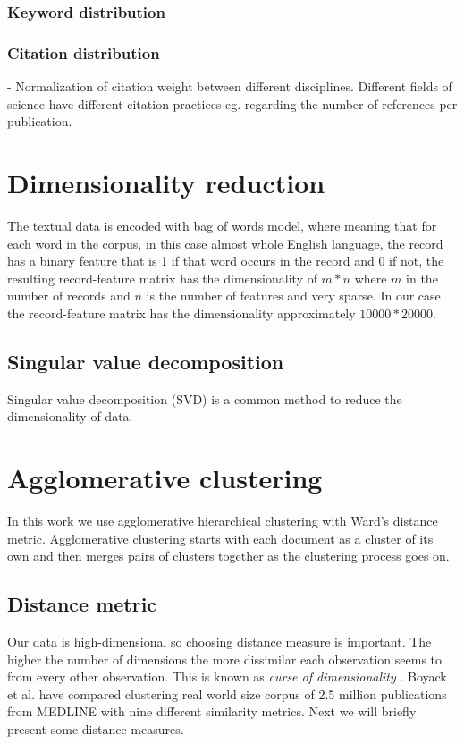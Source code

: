 \subsubsection{Keyword distribution}
\subsubsection{Citation distribution}
- Normalization of citation weight between different disciplines.
  Different fields of science have different citation practices 
eg. regarding the number of references per publication. 
\cite{waltman_new_2012}


\section{Dimensionality reduction}
\label{sec:dimensionalityreduction}
The textual data is encoded with bag of words model, where 
meaning that for each word in the corpus, in this case almost 
whole English language, the record has a binary feature that is 1 
if that word occurs in the record and 0 if not, the resulting 
record-feature matrix has the dimensionality of $m*n$ where $m$ in 
the number of records and $n$ is the number of features and very 
sparse. In our case the record-feature matrix has the 
dimensionality approximately $10000*20000$. 


\subsection{Singular value decomposition}
Singular value decomposition (SVD) is a common method to reduce 
the dimensionality of data. 


\section{Agglomerative clustering}
\label{sec:agglomerativeclustering}
In this work we use agglomerative hierarchical clustering with 
Ward's distance metric.\cite{ref_here} Agglomerative clustering 
starts with each document as a cluster of its own and then 
merges pairs of clusters together as the clustering process goes 
on.


\subsection{Distance metric}
Our data is high-dimensional so choosing distance measure is 
important. The higher the number of dimensions the more 
dissimilar each observation seems to from every other observation. 
This is known as \emph{curse of dimensionality} .
Boyack et al. have compared clustering real world size corpus of 
2.5 million publications from MEDLINE with nine different 
similarity metrics. \cite{boyack_clustering_2011}
Next we will briefly present some distance measures.

